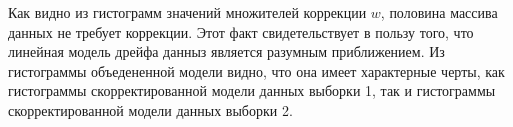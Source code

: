 Как видно из гистограмм значений множителей коррекции $w$, половина массива данных не требует коррекции. Этот факт свидетельствует в пользу того, что линейная модель дрейфа данныз является разумным приближением. Из гистограммы объедененной модели видно, что она имеет характерные черты, как гистограммы скорректированной модели данных выборки 1, так и гистограммы скорректированной модели данных выборки 2.